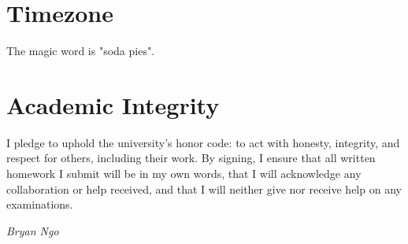 \documentclass{article}
\begin{document}
\section{Timezone}

The magic word is "soda pies".

\section{Academic Integrity}

I pledge to uphold the university's honor code: to act with honesty, integrity, and respect for others, including their work.
By signing, I ensure that all written homework I submit will be in my own words, that I will acknowledge any collaboration or help received, and that I will neither give nor receive help on any examinations.

\begin{flushright}
    \textit{Bryan Ngo}
\end{flushright}
\end{document}
